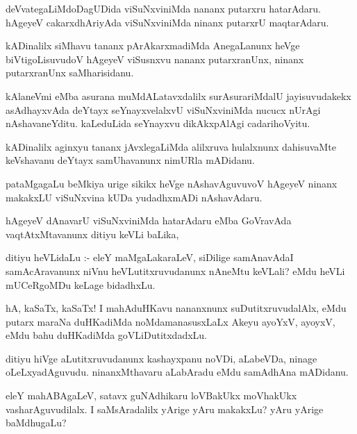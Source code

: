 \documentclass{article}
\begin{document}
\begin{mn}
deVvategaLiMdoDagUDida viSuNxviniMda nananx putarxru hatarAdaru. hAgeyeV 
cakarxdhAriyAda viSuNxviniMda ninanx putarxrU maqtarAdaru. 
\end{mn}

\begin{mn}
kADinalilx siMhavu tananx pArAkarxmadiMda AnegaLanunx  heVge biVtigoLisuvudoV 
hAgeyeV viSusnxvu nananx putarxranUnx, ninanx putarxranUnx saMharisidanu.
\end{mn}

\begin{mn}
kAlaneVmi eMba asurana muMdALatavxdalilx surAsurariMdalU jayisuvudakekx 
asAdhayxvAda deYtayx seYnayxvelalxvU viSuNxviniMda nucucx nUrAgi nAshavaneYditu.
 kaLeduLida seYnayxvu dikAkxpAlAgi cadarihoVyitu.
\end{mn}

\begin{mn}
kADinalilx aginxyu tananx jAvxlegaLiMda alilxruva hulalxnunx dahisuvaMte 
keVshavanu deYtayx samUhavanunx nimURla mADidanu.
\end{mn}

\begin{mn}
pataMgagaLu beMkiya urige sikikx heVge nAshavAguvuvoV hAgeyeV ninanx makakxLU
 viSuNxvina kUDa yudadhxmADi nAshavAdaru.
\end{mn}

\begin{mn}
hAgeyeV dAnavarU viSuNxviniMda hatarAdaru eMba GoVravAda vaqtAtxMtavanunx 
ditiyu keVLi baLika,
\end{mn}

\begin{mn}
ditiyu heVLidaLu :- eleY maMgaLakaraLeV, siDilige samAnavAdaI samAcAravanunx 
niVnu heVLutitxruvudanunx nAneMtu keVLali? eMdu heVLi mUCeRgoMDu keLage bidadhxLu.
\end{mn}

\begin{mn}
hA, kaSaTx, kaSaTx!  I mahAduHKavu nananxnunx suDutitxruvudalAlx, eMdu 
putarx maraNa duHKadiMda noMdamanasusxLaLx Akeyu ayoYxV, ayoyxV, eMdu
bahu duHKadiMda goVLiDutitxdadxLu.
\end{mn}

\begin{mn}
ditiyu hiVge aLutitxruvudanunx kashayxpanu noVDi, aLabeVDa, ninage  
oLeLxyadAguvudu. ninanxMthavaru aLabAradu eMdu samAdhAna mADidanu.
\end{mn}

\begin{mn}
eleY mahABAgaLeV, satavx guNAdhikaru loVBakUkx moVhakUkx vasharAguvudilalx. 
I saMsAradalilx yArige yAru makakxLu?  yAru yArige baMdhugaLu? 
\end{mn}
\end{document}
